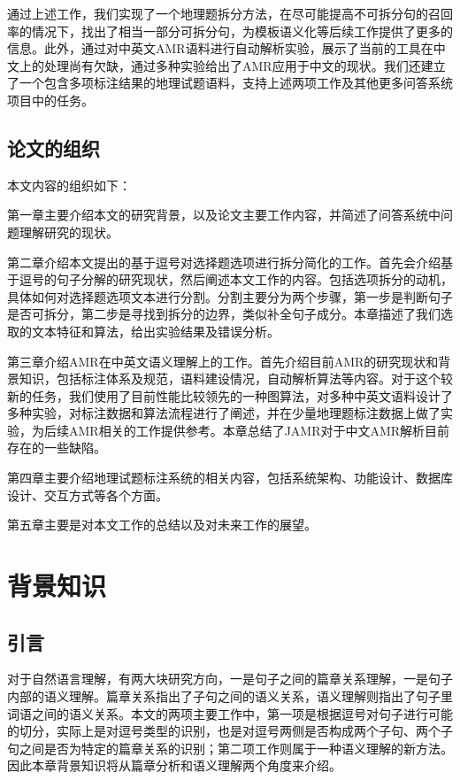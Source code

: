 \documentclass[master, winfont]{njuthesis}
\begin{document}
通过上述工作，我们实现了一个地理题拆分方法，在尽可能提高不可拆分句的召回率的情况下，找出了相当一部分可拆分句，为模板语义化等后续工作提供了更多的信息。此外，通过对中英文AMR语料进行自动解析实验，展示了当前的工具在中文上的处理尚有欠缺，通过多种实验给出了AMR应用于中文的现状。我们还建立了一个包含多项标注结果的地理试题语料，支持上述两项工作及其他更多问答系统项目中的任务。

\section{论文的组织}
本文内容的组织如下：

第一章主要介绍本文的研究背景，以及论文主要工作内容，并简述了问答系统中问题理解研究的现状。

第二章介绍本文提出的基于逗号对选择题选项进行拆分简化的工作。首先会介绍基于逗号的句子分解的研究现状，然后阐述本文工作的内容。包括选项拆分的动机，具体如何对选择题选项文本进行分割。分割主要分为两个步骤，第一步是判断句子是否可拆分，第二步是寻找到拆分的边界，类似补全句子成分。本章描述了我们选取的文本特征和算法，给出实验结果及错误分析。

第三章介绍AMR在中英文语义理解上的工作。首先介绍目前AMR的研究现状和背景知识，包括标注体系及规范，语料建设情况，自动解析算法等内容。对于这个较新的任务，我们使用了目前性能比较领先的一种图算法，对多种中英文语料设计了多种实验，对标注数据和算法流程进行了阐述，并在少量地理题标注数据上做了实验，为后续AMR相关的工作提供参考。本章总结了JAMR对于中文AMR解析目前存在的一些缺陷。

第四章主要介绍地理试题标注系统的相关内容，包括系统架构、功能设计、数据库设计、交互方式等各个方面。

第五章主要是对本文工作的总结以及对未来工作的展望。

\chapter{背景知识}
\section{引言}
对于自然语言理解，有两大块研究方向，一是句子之间的篇章关系理解，一是句子内部的语义理解。篇章关系指出了子句之间的语义关系，语义理解则指出了句子里词语之间的语义关系。本文的两项主要工作中，第一项是根据逗号对句子进行可能的切分，实际上是对逗号类型的识别，也是对逗号两侧是否构成两个子句、两个子句之间是否为特定的篇章关系的识别；第二项工作则属于一种语义理解的新方法。因此本章背景知识将从篇章分析和语义理解两个角度来介绍。
\end{document}
